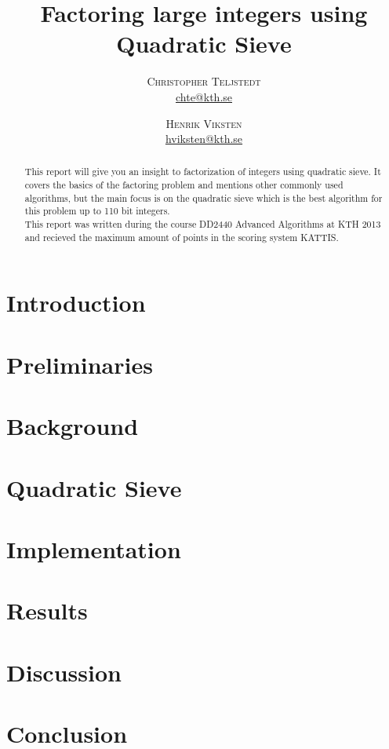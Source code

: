 \documentclass[twoside,11pt,english]{article}
\title{\vspace{-15mm}%
	\fontsize{24pt}{10pt}\selectfont
	\textbf{Factoring large integers using Quadratic Sieve}
	}
\author{%
	\large
	\textsc{Christopher Teljstedt} \\[2mm]
	\normalsize	\href{mailto:chte@kth.se}{chte@kth.se} 
	\and
	\textsc{Henrik Viksten} \\[2mm]
	\normalsize	\href{mailto:hviksten@kth.se}{hviksten@kth.se}
	}
\begin{document}
\maketitle
\thispagestyle{fancy}
\begin{abstract}

\noindent This report will give you an insight to factorization of integers using quadratic sieve. It covers the basics of the factoring problem and mentions other commonly used algorithms, but the main focus is on the quadratic sieve which is the best algorithm for this problem up to 110 bit integers. \\
This report was written during the course DD2440 Advanced Algorithms at KTH 2013 and recieved the maximum amount of points in the scoring system KATTIS.

\end{abstract}
\newpage

\tableofcontents
\newpage

\begin{multicols}{2}
\section{Introduction}

\section{Preliminaries}

\section{Background}

\section{Quadratic Sieve}

\section{Implementation}

\section{Results}

\section{Discussion}

\section{Conclusion}


\newpage



\end{multicols}
\end{document}
